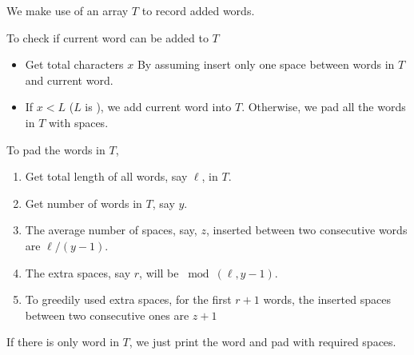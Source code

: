 We make use of an array $T$ to record added words.

To check if current word can be added to $T$
\begin{itemize}
\item Get total characters $x$ By assuming insert only one space between words in $T$ and current word.
\item If $x < L$ ($L$ is ), we add current word into $T$. Otherwise, we pad all the words in $T$ with spaces.
\end{itemize}

To pad the words in $T$, 
\begin{enumerate}
\item Get total length of all words, say $\ell$, in $T$.
\item Get number of words in $T$, say $y$.
\item The average number of spaces, say, $z$, inserted between two consecutive words are $\ell/(y-1)$.
\item The extra spaces, say $r$, will be $\bmod(\ell, y-1)$.
\item To greedily used extra spaces, for the first $r+1$ words, the inserted spaces between two consecutive ones are $ z + 1$
\end{enumerate}

If there is only word in $T$, we just print the word and pad with required spaces.

